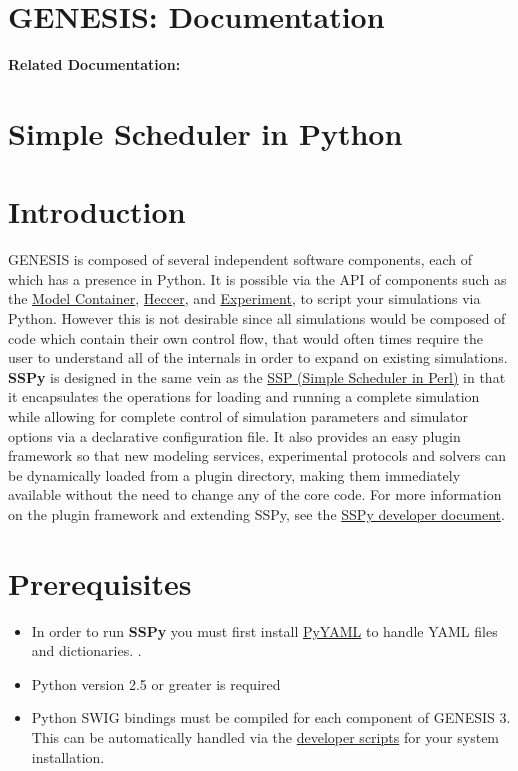 \documentclass[12pt]{article}
\begin{document}
\section*{GENESIS: Documentation}

{\bf Related Documentation:}

\section*{Simple Scheduler in Python}

\section*{Introduction}

	GENESIS is composed of several independent software components, each of which has a presence in Python. It is possible via the API of components such as the \href{../model-container/model-container.tex}{Model Container}, \href{../heccer/heccer.tex}{Heccer}, and \href{../experiment/experiment.tex}{Experiment}, to script your simulations via Python. However this is not desirable since all simulations would be composed of code which contain their own control flow, that would often times require the user to understand all of the internals in order to expand on existing simulations. {\bf SSPy} is designed in the same vein as the \href{../ssp/ssp.tex}{SSP (Simple Scheduler in Perl)} in that it encapsulates the operations for loading and running a complete simulation while allowing for complete control of simulation parameters and simulator options via a declarative configuration file. It also provides an easy plugin framework so that new modeling services, experimental protocols and solvers can be dynamically loaded from a plugin directory, making them immediately available without the need to change any of the core code.  For more information on the plugin framework and extending SSPy, see the \href{../sspy-developer/sspy-developer.tex} {SSPy developer document}.


\section*{Prerequisites}

\begin{itemize}
\item In order to run {\bf SSPy} you must first install \href{http://pyyaml.org/}{PyYAML} to handle YAML files and dictionaries. .

\item Python version 2.5 or greater is required

\item Python SWIG bindings must be compiled for each component of GENESIS 3. This can be automatically handled via the \href{../developer-installation/developer-installation.tex}{developer scripts} for your system installation.
\end{itemize}
\end{document}
